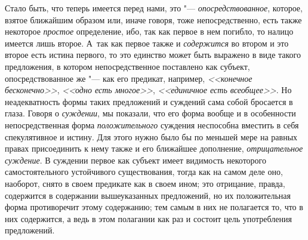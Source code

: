 Стало быть, что теперь имеется перед нами, это "--- {\em опосредствованное},
которое, взятое ближайшим образом или, иначе говоря, тоже
непосредственно, есть также некоторое {\em простое}
определение, ибо, так как первое в нем погибло, то налицо
имеется лишь второе. А~так как первое также и {\em содержится} во
втором и это второе есть истина первого, то это единство может быть
выражено в виде такого предложения, в котором
непосредственное поставлено как субъект, опосредствованное же
"--- как его предикат, например, {\em <<конечное бесконечно>>},
{\em <<одно есть многое>>}, {\em <<единичное есть всеобщее>>}.
Но неадекватность формы таких предложений и суждений сама
собой бросается в глаза. Говоря о {\em суждении}, мы
показали, что его форма вообще и в особенности непосредственная форма
{\em положительного}
суждения неспособна вместить в себя спекулятивное и истину.
Для этого нужно было бы по меньшей мере на равных правах присоединить к
нему также и его ближайшее дополнение,
{\em отрицательное суждение}.
В суждении первое как субъект имеет видимость некоторого
самостоятельного устойчивого существования, тогда как на самом деле оно,
наоборот, снято в своем предикате как в своем ином; это отрицание,
правда, содержится в содержании вышеуказанных предложений, но их
положительная форма противоречит этому содержанию; тем самым в них не
полагается то, что в них содержится, а ведь в этом полагании как раз и
состоит цель употребления предложений.

